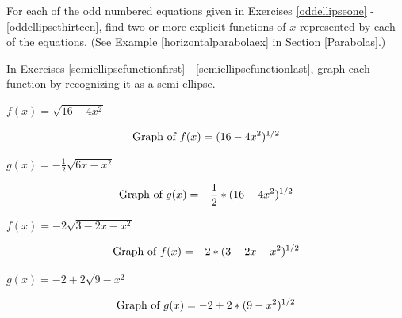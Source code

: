 \documentclass{ximera}
\begin{document}
\begin{problem}
    For each of the odd numbered equations given in Exercises \ref{oddellipseone} - \ref{oddellipsethirteen}, find two or more explicit functions of $x$ represented by each of the equations.  (See Example \ref{horizontalparabolaex} in Section \ref{Parabolas}.)

\begin{solution}

\end{solution}
\end{problem}

\begin{question}

In Exercises \ref{semiellipsefunctionfirst} - \ref{semiellipsefunctionlast}, graph each function by recognizing it as a semi ellipse.

\begin{problem}\label{semiellipsefunctionfirst}
    $f(x) = \sqrt{16-4x^2}$ 

\begin{solution}
$$\text{Graph of $f(x)=(16-4x^2)^{1/2}$}$$
\end{solution}
\end{problem}

\begin{problem}
    $g(x) = -\frac{1}{2} \sqrt{6x-x^2}$

\begin{solution}
$$\text{Graph of $g(x)=-\frac{1}{2}*(16-4x^2)^{1/2}$}$$
\end{solution}
\end{problem}

\begin{problem}
    $f(x) = -2\sqrt{3-2x-x^2}$

\begin{solution}
$$\text{Graph of $f(x)=-2*(3-2x-x^2)^{1/2}$}$$
\end{solution}
\end{problem}

\begin{problem}\label{semiellipsefunctionlast}
    $g(x) = -2 + 2\sqrt{9-x^2}$ 

\begin{solution}
$$\text{Graph of $g(x)=-2+2*(9-x^2)^{1/2}$}$$
\end{solution}
\end{problem}

\end{question}
\end{document}
